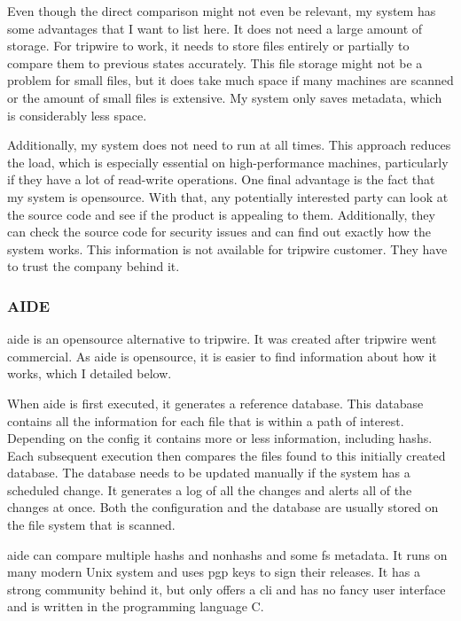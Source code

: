 Even though the direct comparison might not even be relevant, my system has some advantages that I want to list here. It does not need a large amount of storage. For tripwire to work, it needs to store files entirely or partially to compare them to previous states accurately. This file storage might not be a problem for small files, but it does take much space if many machines are scanned or the amount of small files is extensive. My system only saves \gls{metadata}, which is considerably less space.

Additionally, my system does not need to run at all times. This approach reduces the load, which is especially essential on high-performance machines, particularly if they have a lot of read-write operations. One final advantage is the fact that my system is \gls{opensource}. With that, any potentially interested party can look at the source code and see if the product is appealing to them. Additionally, they can check the source code for security issues and can find out exactly how the system works. This information is not available for \gls{tripwire} customer. They have to trust the company behind it.


\subsubsection{AIDE}
\label{sec:aide}

\Gls{aide} is an \gls{opensource} alternative to \gls{tripwire}. It was created after \gls{tripwire} went commercial. As \gls{aide} is \gls{opensource}, it is easier to find information about how it works, which I detailed below. \cite{aide:totherescue, aide:github}

When \gls{aide} is first executed, it generates a reference database. This database contains all the information for each file that is within a path of interest. Depending on the config it contains more or less information, including \glspl{hash}. Each subsequent execution then compares the files found to this initially created database. The database needs to be updated manually if the system has a scheduled change. It generates a log of all the changes and alerts all of the changes at once. Both the configuration and the database are usually stored on the file system that is scanned. \cite{aide, aide:doc}

\Gls{aide} can compare multiple \glspl{hash} and \glspl{nonhash} and some \gls{fs} \gls{metadata}. It runs on many modern Unix system \cite{aide} and uses \gls{pgp} keys to sign their releases. It has a strong community behind it, but only offers a \gls{cli} and has no fancy user interface and is written in the programming language C. \cite{aide:github} 

